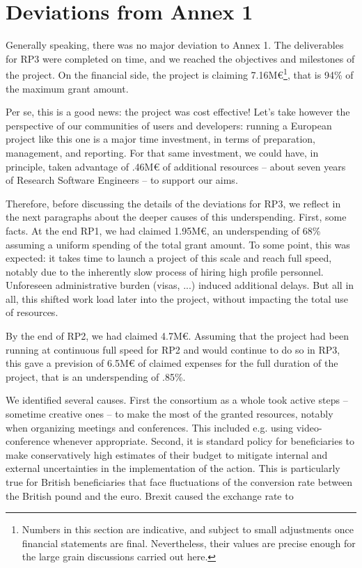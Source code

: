 \section{Deviations from Annex 1}
\label{section.deviations}

Generally speaking, there was no major deviation to Annex 1. The
deliverables for RP3 were completed on time, and we reached the
objectives and milestones of the project. On the financial side, the
project is claiming 7.16M€\footnote{Numbers in this section are
  indicative, and subject to small adjustments once financial
  statements are final. Nevertheless, their values are precise enough
  for the large grain discussions carried out here.}, that is 94\% of
the maximum grant amount.

Per se, this is a good news: the project was cost effective! Let's
take however the perspective of our communities of users and
developers: running a European project like this one is a major time
investment, in terms of preparation, management, and reporting. For
that same investment, we could have, in principle, taken advantage of
.46M€ of additional resources -- about seven years of Research
Software Engineers -- to support our aims.

Therefore, before discussing the details of the deviations for RP3, we
reflect in the next paragraphs about the deeper causes of this
underspending. First, some facts. At the end RP1, we had claimed
1.95M€, an underspending of 68\% assuming a uniform spending of the
total grant amount. To some point, this was expected: it takes time to
launch a project of this scale and reach full speed, notably due to
the inherently slow process of hiring high profile personnel.
Unforeseen administrative burden (visas, ...) induced additional
delays. But all in all, this shifted work load later into the project,
without impacting the total use of resources.

By the end of RP2, we had claimed 4.7M€. Assuming that the project had
been running at continuous full speed for RP2 and would continue to do
so in RP3, this gave a prevision of 6.5M€ of claimed expenses for the
full duration of the project, that is an underspending of .85\%.

We identified several causes. First the consortium as a whole took
active steps -- sometime creative ones -- to make the most of the
granted resources, notably when organizing meetings and conferences.
This included e.g. using video-conference whenever appropriate.
Second, it is standard policy for
beneficiaries to make conservatively high estimates of their budget to
mitigate internal and external uncertainties in the implementation of
the action.
This is particularly true for British
beneficiaries that face fluctuations of the conversion rate between the
British pound and the euro. Brexit caused the exchange rate to

